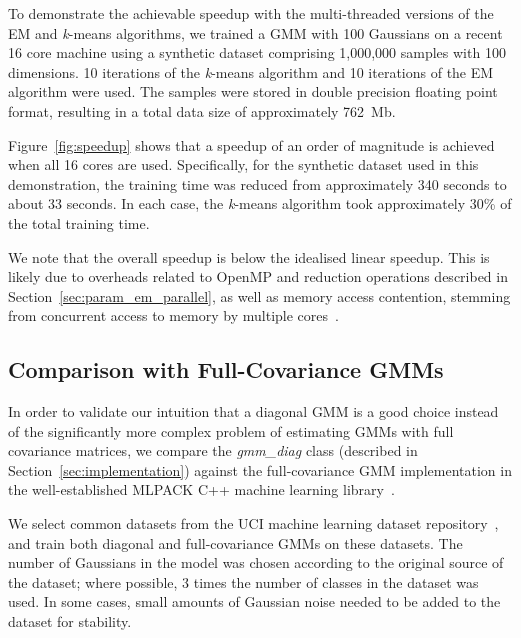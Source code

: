 To demonstrate the achievable speedup with the multi-threaded versions of the EM and {\it k}-means algorithms,
we trained a GMM with 100 Gaussians on a recent 16 core machine using a synthetic dataset comprising 1,000,000 samples with 100 dimensions.
10 iterations of the {\it k}-means algorithm and 10 iterations of the EM algorithm were used.
The samples were stored in double precision floating point format, resulting in a total data size of approximately 762~Mb.

Figure~\ref{fig:speedup} shows that a speedup of an order of magnitude is achieved when all 16 cores are used.
Specifically, for the synthetic dataset used in this demonstration,
the training time was reduced from approximately 340 seconds to about 33 seconds.
In each case, the {\it k}-means algorithm took approximately 30\% of the total training time.

We note that the overall speedup is below the idealised linear speedup.
This is likely due to overheads related to OpenMP and reduction operations described in Section~\ref{sec:param_em_parallel},
as well as memory access contention, stemming from concurrent access to memory by multiple cores~\cite{McCool_2012}.

\subsection{Comparison with Full-Covariance GMMs}


In order to validate our intuition that a diagonal GMM is a good choice instead
of the significantly more complex problem of estimating GMMs with full
covariance matrices, we compare the {\it gmm\_diag} class (described in Section~\ref{sec:implementation})
against the full-covariance GMM implementation in the well-established MLPACK C++ machine learning library~\cite{Curtin_2013}.

We select common datasets from the UCI machine learning dataset
repository~\cite{Lichman_2013}, and train both diagonal and full-covariance
GMMs on these datasets.  The number of Gaussians in the model was chosen
according to the original source of the dataset; where possible, 3 times the
number of classes in the dataset was used.  In some cases, small amounts of
Gaussian noise needed to be added to the dataset for stability.

